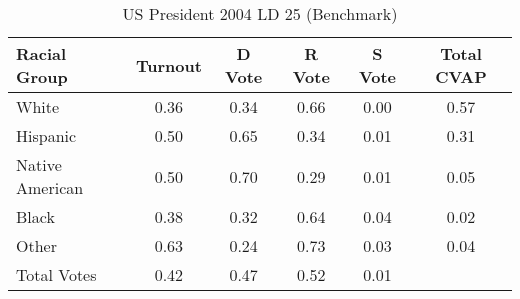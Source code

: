 \begin{table}[htb]
\begin{center}
\caption{US President 2004 LD 25 (Benchmark)}
\label{pres04_cvap_ld_25_benchmark}
\begin{tabular}{lccccc}
  \hline
Racial Group & Turnout & D Vote & R Vote & S Vote & Total CVAP \\ 
  \hline
White & 0.36 & 0.34 & 0.66 & 0.00 & 0.57 \\ 
  Hispanic & 0.50 & 0.65 & 0.34 & 0.01 & 0.31 \\ 
  Native American & 0.50 & 0.70 & 0.29 & 0.01 & 0.05 \\ 
  Black & 0.38 & 0.32 & 0.64 & 0.04 & 0.02 \\ 
  Other & 0.63 & 0.24 & 0.73 & 0.03 & 0.04 \\ 
  Total Votes & 0.42 & 0.47 & 0.52 & 0.01 &  \\ 
   \hline
\end{tabular}
\end{center}
\end{table}
